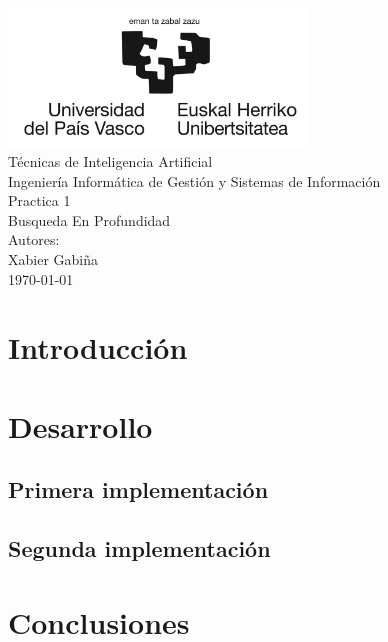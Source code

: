 \documentclass{report}
\begin{document}
    \begin{titlepage}
        \centering
        \includegraphics[width=0.6\textwidth]{./.img/logo.jpg}\\
        \vspace{1cm}
        \LARGE Técnicas de Inteligencia Artificial\\
        \vspace{0.5cm}
        \Large Ingeniería Informática de Gestión y Sistemas de Información\\
        \vspace{3cm}
        \Huge Practica 1\\
        \huge Busqueda En Profundidad\\
        \vspace{2.5cm}
        \Large Autores:\\
        \vspace{0.2cm}
        \large Xabier Gabiña\\
        \vfill
        \today
    \end{titlepage}
    \tableofcontents
    \listoffigures
    \listoftables
    \chapter{Introducción}
    \chapter{Desarrollo}
      \section{Primera implementación}
      \section{Segunda implementación}
    \chapter{Conclusiones}
    
    
\end{document}
